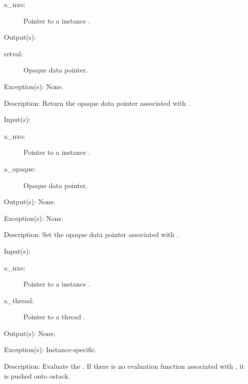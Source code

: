 \begin{capi}
\begin{capilist}
		\begin{description}\item[]
		\item[a\_nxo: ]
			Pointer to a instance .
		\end{description}
	\item[Output(s): ]
		\begin{description}\item[]
		\item[retval: ]
			Opaque data pointer.
		\end{description}
	\item[Exception(s): ] None.
	\item[Description: ]
		Return the opaque data pointer associated with .
	\end{capilist}
\label{nxo_instance_opaque_set}
	\begin{capilist}
	\item[Input(s): ]
		\begin{description}\item[]
		\item[a\_nxo: ]
			Pointer to a instance .
		\item[a\_opaque: ]
			Opaque data pointer.
		\end{description}
	\item[Output(s): ] None.
	\item[Exception(s): ] None.
	\item[Description: ]
		Set the opaque data pointer associated with .
	\end{capilist}
\label{nxo_instance_eval}
	\begin{capilist}
	\item[Input(s): ]
		\begin{description}\item[]
		\item[a\_nxo: ]
			Pointer to a instance \classname{nxo}.
		\item[a\_thread: ]
			Pointer to a thread \classname{nxo}.
		\end{description}
	\item[Output(s): ] None.
	\item[Exception(s): ] Instance-specific.
	\item[Description: ]
		Evaluate the .  If there is no evaluation function
		associated with , it is pushed onto ostack.
	\end{capilist}
\end{capi}
